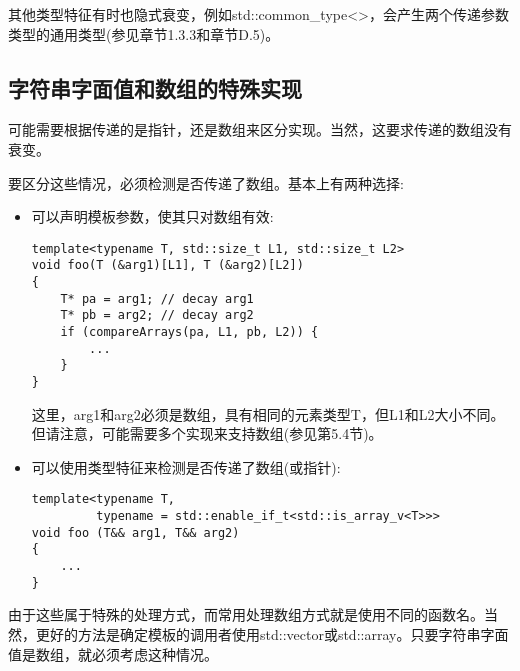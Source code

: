 其他类型特征有时也隐式衰变，例如std::common\_type<>，会产生两个传递参数类型的通用类型(参见章节1.3.3和章节D.5)。

\subsection{字符串字面值和数组的特殊实现}

可能需要根据传递的是指针，还是数组来区分实现。当然，这要求传递的数组没有衰变。

要区分这些情况，必须检测是否传递了数组。基本上有两种选择:

\begin{itemize}
\item 
可以声明模板参数，使其只对数组有效:

\begin{lstlisting}[style=styleCXX]
template<typename T, std::size_t L1, std::size_t L2>
void foo(T (&arg1)[L1], T (&arg2)[L2])
{
	T* pa = arg1; // decay arg1
	T* pb = arg2; // decay arg2
	if (compareArrays(pa, L1, pb, L2)) {
		...
	}
}
\end{lstlisting}

这里，arg1和arg2必须是数组，具有相同的元素类型T，但L1和L2大小不同。但请注意，可能需要多个实现来支持数组(参见第5.4节)。

\item 
可以使用类型特征来检测是否传递了数组(或指针):

\begin{lstlisting}[style=styleCXX]
template<typename T,
		 typename = std::enable_if_t<std::is_array_v<T>>>
void foo (T&& arg1, T&& arg2)
{
	...
}
\end{lstlisting}
\end{itemize}

由于这些属于特殊的处理方式，而常用处理数组方式就是使用不同的函数名。当然，更好的方法是确定模板的调用者使用std::vector或std::array。只要字符串字面值是数组，就必须考虑这种情况。


















